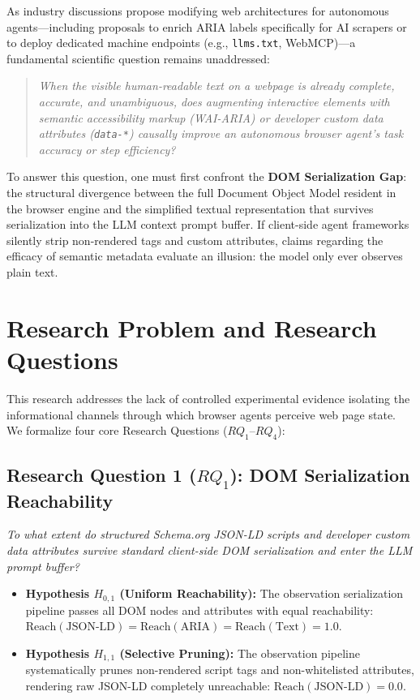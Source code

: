 \documentclass[11pt,a4paper]{article}
\begin{document}
As industry discussions propose modifying web architectures for autonomous agents---including proposals to enrich ARIA labels specifically for AI scrapers or to deploy dedicated machine endpoints (e.g., \texttt{llms.txt}, WebMCP)---a fundamental scientific question remains unaddressed:
\begin{quote}
\textit{When the visible human-readable text on a webpage is already complete, accurate, and unambiguous, does augmenting interactive elements with semantic accessibility markup (WAI-ARIA) or developer custom data attributes (\texttt{data-*}) causally improve an autonomous browser agent's task accuracy or step efficiency?}
\end{quote}

To answer this question, one must first confront the \textbf{DOM Serialization Gap}: the structural divergence between the full Document Object Model resident in the browser engine and the simplified textual representation that survives serialization into the LLM context prompt buffer. If client-side agent frameworks silently strip non-rendered tags and custom attributes, claims regarding the efficacy of semantic metadata evaluate an illusion: the model only ever observes plain text.

\section{Research Problem and Research Questions}
\label{sec:rq}

This research addresses the lack of controlled experimental evidence isolating the informational channels through which browser agents perceive web page state. We formalize four core Research Questions ($RQ_1$--$RQ_4$):

\subsection{Research Question 1 ($RQ_1$): DOM Serialization Reachability}
\textit{To what extent do structured Schema.org JSON-LD scripts and developer custom data attributes survive standard client-side DOM serialization and enter the LLM prompt buffer?}
\begin{itemize}
    \item \textbf{Hypothesis $H_{0,1}$ (Uniform Reachability):} The observation serialization pipeline passes all DOM nodes and attributes with equal reachability: $\text{Reach}(\text{JSON-LD}) = \text{Reach}(\text{ARIA}) = \text{Reach}(\text{Text}) = 1.0$.
    \item \textbf{Hypothesis $H_{1,1}$ (Selective Pruning):} The observation pipeline systematically prunes non-rendered script tags and non-whitelisted attributes, rendering raw JSON-LD completely unreachable: $\text{Reach}(\text{JSON-LD}) = 0.0$.
\end{itemize}
\end{document}
